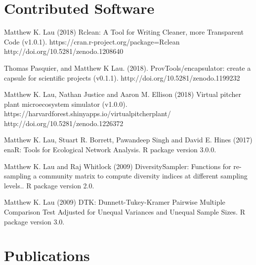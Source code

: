 \documentclass[a4paper]{article}
\begin{document}
\section{Contributed Software}\label{contributed-software}

{Matthew K. Lau (2018) Rclean: A Tool for Writing Cleaner, more
  Transparent Code (v1.0.1). https://cran.r-project.org/package=Rclean
  http://doi.org/10.5281/zenodo.1208640}

{Thomas Pasquier, and Matthew K Lau. (2018). ProvTools/encapsulator:
  create a capsule for scientific projects
  (v0.1.1). http://doi.org/10.5281/zenodo.1199232}

{Matthew K. Lau, Nathan Justice and Aaron M. Ellison (2018) Virtual
  pitcher plant microecosystem simulator
  (v1.0.0). https://harvardforest.shinyapps.io/virtualpitcherplant/
  http://doi.org/10.5281/zenodo.1226372}

{Matthew K. Lau, Stuart R. Borrett, Pawandeep Singh and David E. Hines
  (2017) enaR: Tools for Ecological Network Analysis. R package
  version 3.0.0.}

{Matthew K. Lau and Raj Whitlock (2009) DiversitySampler: Functions
  for re-sampling a community matrix to compute diversity indices at
  different sampling levels.. R package version 2.0.}

{Matthew K. Lau (2009) DTK: Dunnett-Tukey-Kramer Pairwise Multiple
Comparison Test Adjusted for Unequal Variances and Unequal Sample Sizes.
R package version 3.0.}

\section{Publications}\label{publications}
\end{document}
